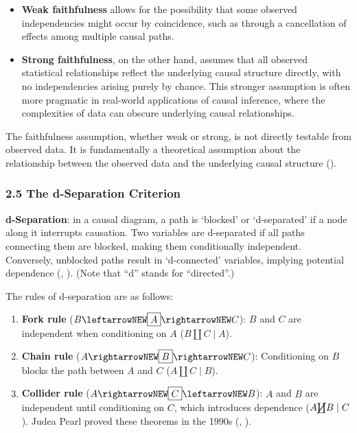 \documentclass[
  single column]{article}
\providecommand{\tightlist}{%
  \setlength{\itemsep}{0pt}\setlength{\parskip}{0pt}}\usepackage{longtable,booktabs,array}
\begin{document}
\begin{itemize}
\tightlist
\item
  \textbf{Weak faithfulness} allows for the possibility that some
  observed independencies might occur by coincidence, such as through a
  cancellation of effects among multiple causal paths.
\item
  \textbf{Strong faithfulness}, on the other hand, assumes that all
  observed statistical relationships reflect the underlying causal
  structure directly, with no independencies arising purely by chance.
  This stronger assumption is often more pragmatic in real-world
  applications of causal inference, where the complexities of data can
  obscure underlying causal relationships.
\end{itemize}

The faithfulness assumption, whether weak or strong, is not directly
testable from observed data. It is fundamentally a theoretical
assumption about the relationship between the observed data and the
underlying causal structure ().

\subsubsection{2.5 The d-Separation
Criterion}\label{the-d-separation-criterion}

\textbf{d-Separation}: in a causal diagram, a path is `blocked' or
`d-separated' if a node along it interrupts causation. Two variables are
d-separated if all paths connecting them are blocked, making them
conditionally independent. Conversely, unblocked paths result in
`d-connected' variables, implying potential dependence
(, ).
(Note that ``d'' stands for ``directed''.)

The rules of d-separation are as follows:

\begin{enumerate}
\def\labelenumi{\arabic{enumi}.}
\tightlist
\item
  \textbf{Fork rule} (\(B \leftarrowNEW \boxed{A} \rightarrowNEW C\)):
  \(B\) and \(C\) are independent when conditioning on \(A\)
  (\(B \coprod C \mid A\)).
\item
  \textbf{Chain rule} (\(A \rightarrowNEW \boxed{B} \rightarrowNEW C\)):
  Conditioning on \(B\) blocks the path between \(A\) and \(C\)
  (\(A \coprod C \mid B\)).
\item
  \textbf{Collider rule}
  (\(A \rightarrowNEW \boxed{C} \leftarrowNEW B\)): \(A\) and \(B\) are
  independent until conditioning on \(C\), which introduces dependence
  (\(A \cancel{\coprod} B \mid C\)). Judea Pearl proved these theorems
  in the 1990s (,
  ).
\end{enumerate}
\end{document}
